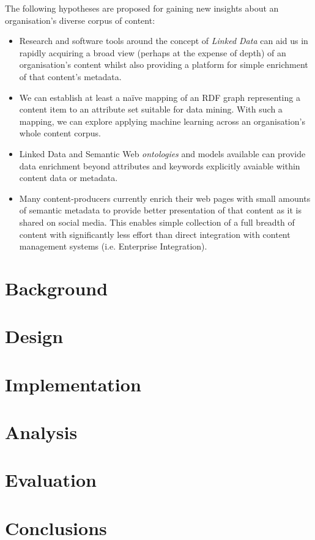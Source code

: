 \documentclass{sig-alternate-05-2015}
\begin{document}
The following hypotheses are proposed for gaining new insights about an
organisation's diverse corpus of content:

\begin{itemize}

\item Research and software tools around the concept of \emph{Linked Data} can
aid us in rapidly acquiring a broad view (perhaps at the expense of depth) of an
organisation's content whilst also providing a platform for simple enrichment of
that content's metadata.

\item We can establish at least a na\"ive mapping of an RDF graph representing a
content item to an attribute set suitable for data mining. With such a mapping,
we can explore applying machine learning across an organisation's whole content
corpus.

\item Linked Data and Semantic Web \emph{ontologies} and models available can
provide data enrichment beyond attributes and keywords explicitly avaiable
within content data or metadata.

\item Many content-producers currently enrich their web pages with small
amounts of semantic metadata to provide better presentation of that content
as it is shared on social media. This enables simple collection of a full
breadth of content with significantly less effort than direct integration
with content management systems (i.e. Enterprise Integration).

\end{itemize}

\section{Background}

\section{Design}

\section{Implementation}

\section{Analysis}

\section{Evaluation}

\section{Conclusions}

%
%
\end{document}
